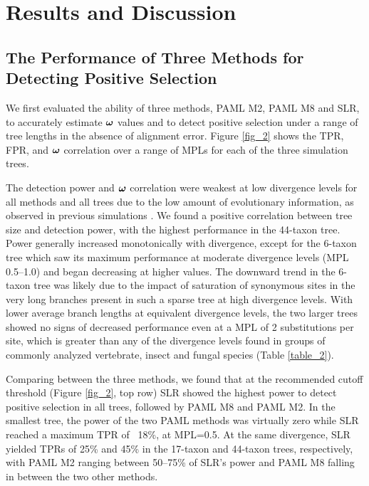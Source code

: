 \documentclass{article}
\begin{document}
\section*{Results and Discussion}
\subsection*{The Performance of Three Methods for Detecting \Sw Positive Selection}
We first evaluated the ability of three \sw methods, PAML M2,
PAML M8 and SLR, to accurately estimate \sw $\bm{\omega}$ values and to
detect positive selection under a range of tree lengths in the absence
of alignment error. Figure \ref{fig_2} shows the TPR, FPR, \tpr{} and \sw $\bm{\omega}$
correlation over a range of MPLs for each of the three simulation
trees.

The detection power and $\bm{\omega}$ correlation were weakest at low
divergence levels for all methods and all trees due to the low amount
of evolutionary information, as observed in previous simulations
\citep{Anisimova2002Accuracy}. We found a positive correlation between
tree size and detection power, with the highest performance in the
44-taxon tree. Power generally increased monotonically with
divergence, except for the 6-taxon tree which saw its maximum
performance at moderate divergence levels (MPL 0.5--1.0) and began
decreasing at higher values. The downward trend in the 6-taxon tree
was likely due to the impact of saturation of synonymous sites in the
very long branches present in such a sparse tree at high divergence
levels. With lower average branch lengths at equivalent divergence
levels, the two larger trees showed no signs of decreased performance
even at a MPL of 2 substitutions per site, which is greater than any
of the divergence levels found in groups of commonly analyzed
vertebrate, insect and fungal species (Table \ref{table_2}).

Comparing between the three \sw methods, we found that at the
recommended cutoff threshold (Figure \ref{fig_2}, top row) SLR showed
the highest power to detect positive selection in all trees, followed
by PAML M8 and PAML M2. In the smallest tree, the power of the two
PAML methods was virtually zero while SLR reached a maximum TPR of ~18\%,
at MPL=0.5. At the same divergence, SLR yielded TPRs of 25\% and 45\%
in the 17-taxon and 44-taxon trees, respectively, with PAML M2 ranging
between 50--75\% of SLR’s power and PAML M8 falling in between the two
other methods.
\end{document}
